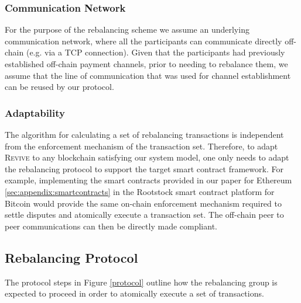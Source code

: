\documentclass[sigconf]{acmart}
\newcommand{\name}{\textsc{Revive}\xspace}
\newcommand{\todo}[1]{{\bf \color{darkred}$\blacktriangleright$#1$\blacktriangleleft$}}
\begin{document}
\subsubsection{Communication Network}
For the purpose of the rebalancing scheme we assume an underlying communication network, where all the participants can communicate directly off-chain (e.g. via a TCP connection). Given that the participants had previously established off-chain payment channels, prior to needing to rebalance them, we assume that the line of communication that was used for channel establishment can be reused by our protocol.

\subsubsection{Adaptability}
{\color{blue}
The algorithm for calculating a set of rebalancing transactions is independent from the enforcement mechanism of the transaction set. Therefore, to adapt \name to any blockchain satisfying our system model, one only needs to adapt the rebalancing protocol to support the target smart contract framework. For example, implementing the smart contracts provided in our paper for Ethereum \ref{sec:appendix:smartcontracts} in the Rootstock \cite{rootstock} smart contract platform for Bitcoin would provide the same on-chain enforcement mechanism required to settle disputes and atomically execute a transaction set. The off-chain peer to peer communications can then be directly made compliant.
}

\subsection{Rebalancing Protocol}
The protocol steps in Figure \ref{protocol} outline how the rebalancing group is expected to proceed in order to atomically execute a set of transactions.
\end{document}

